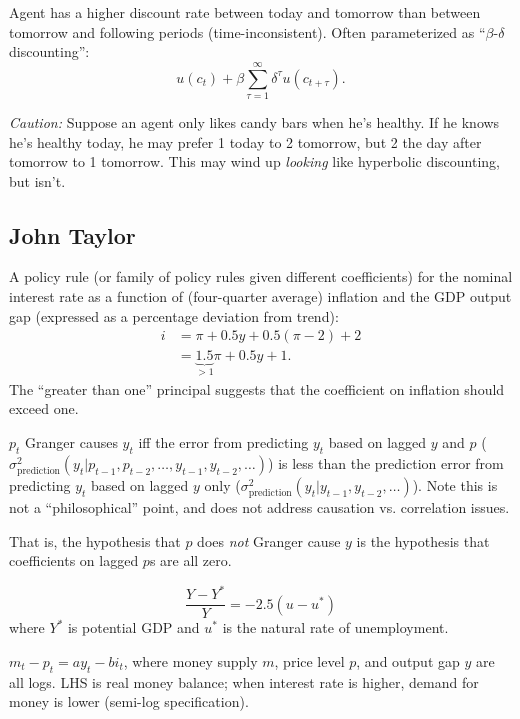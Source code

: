 \documentclass[8pt,letterpaper, landscape]{extarticle} %
\begin{document}
\begin{multicols}{3}
\begin{description}
 Agent has a higher discount rate between today and tomorrow than between tomorrow and following periods (time-inconsistent). Often parameterized as ``$ \beta $-$ \delta $ discounting'':
\[ u(c_t) + \beta \sum_{\tau = 1}^{\infty} \delta^\tau u(c_{t + \tau}) . \]

\textit{Caution:} Suppose an agent only likes candy bars when he's healthy. If he knows he's healthy today, he may prefer 1 today to 2 tomorrow, but 2 the day after tomorrow to 1 tomorrow. This may wind up \textit{looking} like hyperbolic discounting, but isn't.

\subsection{John Taylor}
 A policy rule (or family of policy rules given different coefficients) for the nominal interest rate as a function of (four-quarter average) inflation and the GDP output gap (expressed as a percentage deviation from trend):
\begin{align*}
i &= \pi + 0.5 y + 0.5 (\pi - 2) + 2 \\
&= \underbrace{1.5}_{>1} \pi + 0.5 y + 1.
\end{align*}
The ``greater than one'' principal suggests that the coefficient on inflation should exceed one.

 $ p_t $ Granger causes $ y_t $ iff the error from predicting $ y_t $ based on lagged $ y $ and $ p $ ($ \sigma^2_{\text{prediction}} (y_t | p_{t-1} , p_{t-2} , \dotsc , y_{t-1}, y_{t-2}, \dotsc ) $) is less than the prediction error from predicting $ y_t $ based on lagged $ y $ only ($ \sigma^2_{\text{prediction}} (y_t |  y_{t-1}, y_{t-2}, \dotsc ) $). Note this is not a ``philosophical'' point, and does not address causation vs. correlation issues.

That is, the hypothesis that $ p $ does \textit{not} Granger cause $ y $ is the hypothesis that coefficients on lagged $ p $s are all zero.

\[ \frac{Y - Y^*}{Y} = -2.5 (u - u^*) \]
where $ Y^* $ is potential GDP and $ u^* $ is the natural rate of unemployment.

 $ m_t - p_t = a y_t - b i_t $, where money supply $ m $, price level $ p $, and output gap $ y $ are all logs. LHS is real money balance; when interest rate is higher, demand for money is lower (semi-log specification).


\end{description}
\end{multicols}
\end{document}
